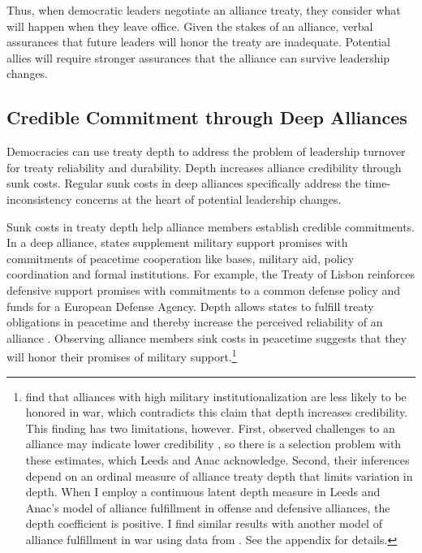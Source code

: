 \documentclass[12pt]{article}
\begin{document}
Thus, when democratic leaders negotiate an alliance treaty, they consider what will happen when they leave office.
Given the stakes of an alliance, verbal assurances that future leaders will honor the treaty are inadequate.
Potential allies will require stronger assurances that the alliance can survive leadership changes. 


\subsection{Credible Commitment through Deep Alliances}


Democracies can use treaty depth to address the problem of leadership turnover for treaty reliability and durability. 
Depth increases alliance credibility through sunk costs.
Regular sunk costs in deep alliances specifically address the time-inconsistency concerns at the heart of potential leadership changes.


Sunk costs in treaty depth help alliance members establish credible commitments.
In a deep alliance, states supplement military support promises with commitments of peacetime cooperation like bases, military aid, policy coordination and formal institutions. 
For example, the Treaty of Lisbon reinforces defensive support promises with commitments to a common defense policy and funds for a European Defense Agency. 
Depth allows states to fulfill treaty obligations in peacetime and thereby increase the perceived reliability of an alliance \citep{Morrow1994}. 
Observing alliance members sink costs in peacetime suggests that they will honor their promises of military support.\footnote{\citet{LeedsAnac2005} find that alliances with high military institutionalization are less likely to be honored in war, which contradicts this claim that depth increases credibility. 
This finding has two limitations, however. 
First, observed challenges to an alliance may indicate lower credibility \citep{Smith1995}, so there is a selection problem with these estimates, which Leeds and Anac acknowledge. 
Second, their inferences depend on an ordinal measure of alliance treaty depth that limits variation in depth. 
When I employ a continuous latent depth measure in Leeds and Anac's model of alliance fulfillment in offense and defensive alliances, the depth coefficient is positive. 
I find similar results with another model of alliance fulfillment in war using data from \citet{BerkemeierFuhrmann2018}.
See the appendix for details.} 
\end{document}
